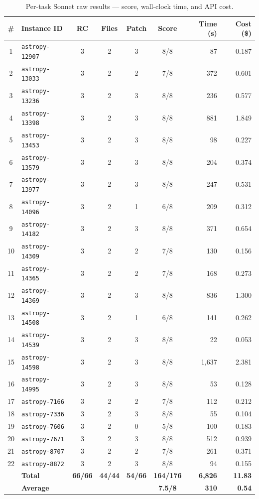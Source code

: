 \begin{table}[h]
\centering
\small
\caption{Per-task Sonnet raw results --- score, wall-clock time, and API cost.}\label{tab:per-task-raw-sonnet}
\setlength{\tabcolsep}{4pt}
\begin{tabular}{clccccrr}
\toprule
\textbf{\#} & \textbf{Instance ID} & \textbf{RC} & \textbf{Files} & \textbf{Patch} & \textbf{Score} & \textbf{Time (s)} & \textbf{Cost (\$)} \\
\midrule
 1 & \texttt{astropy-12907} & 3 & 2 & 3 & 8/8 &     87 & 0.187 \\
 2 & \texttt{astropy-13033} & 3 & 2 & 2 & 7/8 &    372 & 0.601 \\
 3 & \texttt{astropy-13236} & 3 & 2 & 3 & 8/8 &    236 & 0.577 \\
 4 & \texttt{astropy-13398} & 3 & 2 & 3 & 8/8 &    881 & 1.849 \\
 5 & \texttt{astropy-13453} & 3 & 2 & 3 & 8/8 &     98 & 0.227 \\
 6 & \texttt{astropy-13579} & 3 & 2 & 3 & 8/8 &    204 & 0.374 \\
 7 & \texttt{astropy-13977} & 3 & 2 & 3 & 8/8 &    247 & 0.531 \\
 8 & \texttt{astropy-14096} & 3 & 2 & 1 & 6/8 &    209 & 0.312 \\
 9 & \texttt{astropy-14182} & 3 & 2 & 3 & 8/8 &    371 & 0.654 \\
10 & \texttt{astropy-14309} & 3 & 2 & 2 & 7/8 &    130 & 0.156 \\
11 & \texttt{astropy-14365} & 3 & 2 & 2 & 7/8 &    168 & 0.273 \\
12 & \texttt{astropy-14369} & 3 & 2 & 3 & 8/8 &    836 & 1.300 \\
13 & \texttt{astropy-14508} & 3 & 2 & 1 & 6/8 &    141 & 0.262 \\
14 & \texttt{astropy-14539} & 3 & 2 & 3 & 8/8 &     22 & 0.053 \\
15 & \texttt{astropy-14598} & 3 & 2 & 3 & 8/8 & 1{,}637 & 2.381 \\
16 & \texttt{astropy-14995} & 3 & 2 & 3 & 8/8 &     53 & 0.128 \\
17 & \texttt{astropy-7166}  & 3 & 2 & 2 & 7/8 &    112 & 0.212 \\
18 & \texttt{astropy-7336}  & 3 & 2 & 3 & 8/8 &     55 & 0.104 \\
19 & \texttt{astropy-7606}  & 3 & 2 & 0 & 5/8 &    100 & 0.183 \\
20 & \texttt{astropy-7671}  & 3 & 2 & 3 & 8/8 &    512 & 0.939 \\
21 & \texttt{astropy-8707}  & 3 & 2 & 2 & 7/8 &    261 & 0.371 \\
22 & \texttt{astropy-8872}  & 3 & 2 & 3 & 8/8 &     94 & 0.155 \\
\midrule
   & \textbf{Total}  & \textbf{66/66} & \textbf{44/44} & \textbf{54/66} & \textbf{164/176} & \textbf{6{,}826} & \textbf{11.83} \\
   & \textbf{Average} &       &       &       & \textbf{7.5/8}   & \textbf{310} & \textbf{0.54} \\
\bottomrule
\end{tabular}
\end{table}

